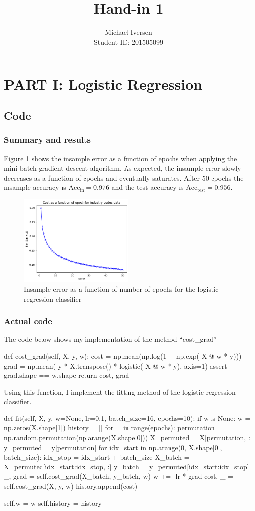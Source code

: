 \documentclass{article}
\title{Hand-in 1}
\author{Michael Iversen\\
Student ID: 201505099}
\begin{document}
\maketitle
\section*{PART I: Logistic Regression}
	\subsection*{Code}
	\subsubsection*{Summary and results}
	Figure \ref{fig:logreg} shows the insample error as a function of epochs when applying the mini-batch gradient descent algorithm.
	As expected, the insample error slowly decreases as a function of epochs and eventually saturates.
	After $50$ epochs the insample accuracy is $\mathrm{Acc}_\mathrm{in} = 0.976$ and the test accuracy is $\mathrm{Acc}_\mathrm{test} = 0.956$.
	\begin{figure}
		\centering
		\includegraphics[width=0.5\textwidth]{logreg_text_cost_per_epoch.png}
		\caption{Insample error as a function of number of epochs for the logistic regression classifier}
		\label{fig:logreg}
	\end{figure}
	\subsubsection*{Actual code}
	The code below shows my implementation of the method ``cost\_grad''
	\begin{python}
def cost_grad(self, X, y, w):
	cost = np.mean(np.log(1 + np.exp(-X @ w * y)))
	grad = np.mean(-y * X.transpose() * logistic(-X @ w * y), axis=1)
	assert grad.shape == w.shape
	return cost, grad
	\end{python}
	Using this function, I implement the fitting method of the logistic regression classifier.
	\begin{python}
def fit(self, X, y, w=None, lr=0.1, batch_size=16, epochs=10):
	if w is None:
		w = np.zeros(X.shape[1])
	history = []
	for _ in range(epochs):
		permutation = np.random.permutation(np.arange(X.shape[0]))
		X_permuted = X[permutation, :]
		y_permuted = y[permutation]
		for idx_start in np.arange(0, X.shape[0], batch_size):
			idx_stop = idx_start + batch_size
			X_batch = X_permuted[idx_start:idx_stop, :]
			y_batch = y_permuted[idx_start:idx_stop]
			_, grad = self.cost_grad(X_batch, y_batch, w)
			w += -lr * grad
		cost, _ = self.cost_grad(X, y, w)
		history.append(cost)

	self.w = w
	self.history = history
	\end{python}
\end{document}
